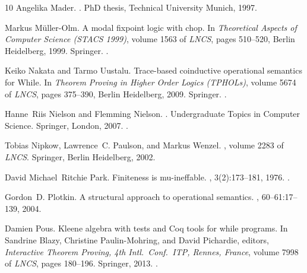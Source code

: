\documentclass[10pt,a4paper]{amsart}
\theoremstyle{definition}
\begin{document}
\begin{thebibliography}{10}
Angelika Mader.
.
\newblock PhD thesis, Technical University Munich, 1997.

Markus M{\"{u}}ller{-}Olm.
\newblock A modal fixpoint logic with chop.
\newblock In {\em Theoretical Aspects of Computer Science (STACS 1999)}, volume
  1563 of {\em LNCS}, pages 510--520, Berlin Heidelberg, 1999. Springer.
\newblock \href {https://doi.org/10.1007/3-540-49116-3\_48}
  {}.

Keiko Nakata and Tarmo Uustalu.
\newblock Trace-based coinductive operational semantics for {While}.
\newblock In {\em Theorem Proving in Higher Order Logics (TPHOLs)}, volume 5674
  of {\em LNCS}, pages 375--390, Berlin Heidelberg, 2009. Springer.
\newblock \href {https://doi.org/10.1007/978-3-642-03359-9\_26}
  {}.

Hanne~Riis Nielson and Flemming Nielson.
.
\newblock Undergraduate Topics in Computer Science. Springer, London, 2007.
\newblock \href {https://doi.org/10.1007/978-1-84628-692-6}
  {}.

Tobias Nipkow, Lawrence~C. Paulson, and Markus Wenzel.
,
  volume 2283 of {\em LNCS}.
\newblock Springer, Berlin Heidelberg, 2002.

David Michael~Ritchie Park.
\newblock Finiteness is mu-ineffable.
, 3(2):173--181, 1976.
\newblock \href {https://doi.org/10.1016/0304-3975(76)90022-0}
  {}.

Gordon~D. Plotkin.
\newblock A structural approach to operational semantics.
, 60--61:17--139, 2004.

Damien Pous.
\newblock Kleene algebra with tests and {Coq} tools for while programs.
\newblock In Sandrine Blazy, Christine Paulin{-}Mohring, and David Pichardie,
  editors, {\em Interactive Theorem Proving, 4th Intl.\ Conf.\, {ITP}, Rennes,
  France}, volume 7998 of {\em LNCS}, pages 180--196. Springer, 2013.
\newblock \href {https://doi.org/10.1007/978-3-642-39634-2\_15}
  {}.


\end{thebibliography}
\end{document}
